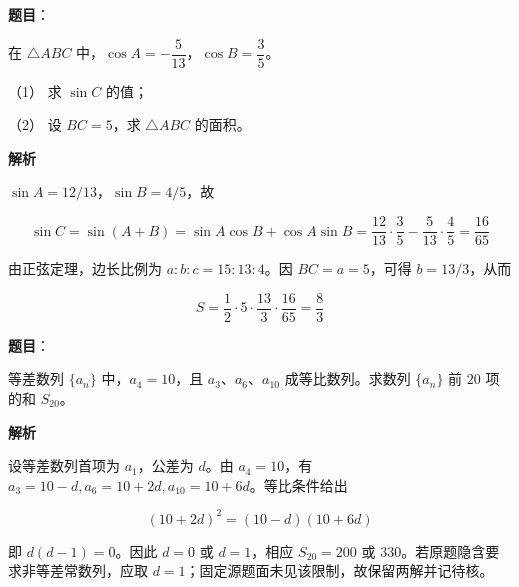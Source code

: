 \begin{answer}

\textbf{题目}：

在 $\triangle ABC$ 中，$\cos A=-\dfrac5{13}$，$\cos B=\dfrac35$。

（1） 求 $\sin C$ 的值；

（2） 设 $BC=5$，求 $\triangle ABC$ 的面积。

\textbf{解析}


$\sin A=12/13$，$\sin B=4/5$，故

\nopagebreak[4]
\[
\sin C=\sin(A+B)=\sin A\cos B+\cos A\sin B
=\frac{12}{13}\cdot\frac35-\frac5{13}\cdot\frac45
=\frac{16}{65}
\]


由正弦定理，边长比例为 $a:b:c=15:13:4$。因 $BC=a=5$，可得 $b=13/3$，从而

\nopagebreak[4]
\[
S=\frac12\cdot5\cdot\frac{13}{3}\cdot\frac{16}{65}
=\frac83
\]



\end{answer}
\begin{answer}

\textbf{题目}：

等差数列 $\{a_n\}$ 中，$a_4=10$，且 $a_3\text{、}a_6\text{、}a_{10}$ 成等比数列。求数列 $\{a_n\}$ 前 $20$ 项的和 $S_{20}$。

\textbf{解析}

设等差数列首项为 $a_1$，公差为 $d$。由 $a_4=10$，有 $a_3=10-d,a_6=10+2d,a_{10}=10+6d$。等比条件给出

\nopagebreak[4]
\[
(10+2d)^2=(10-d)(10+6d)
\]

即 $d(d-1)=0$。因此 $d=0$ 或 $d=1$，相应 $S_{20}=200$ 或 $330$。若原题隐含要求非等差常数列，应取 $d=1$；固定源题面未见该限制，故保留两解并记待核。


\end{answer}
